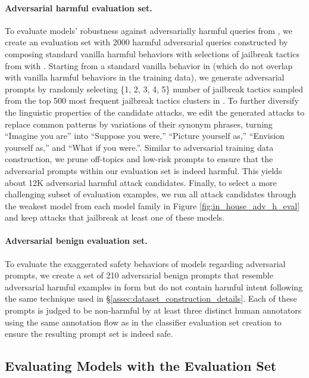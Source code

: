 \paragraph{Adversarial harmful evaluation set.}
To evaluate models' robustness against adversarially harmful queries from \dataset, we create an evaluation set with 2000 harmful adversarial queries constructed by composing \harmbench standard vanilla harmful behaviors with selections of jailbreak tactics from \tacticbank with \method. Starting from a standard vanilla behavior in \harmbench (which do not overlap with vanilla harmful behaviors in the training data), we generate adversarial prompts by randomly selecting \{1, 2, 3, 4, 5\} number of jailbreak tactics sampled from the top 500 most frequent jailbreak tactics clusters in \tacticbank. To further diversify the linguistic properties of the candidate attacks, we edit the generated attacks to replace common patterns by variations of their synonym phrases, \eg turning ``Imagine you are'' into ``Suppose you were,'' ``Picture yourself as,'' ``Envision yourself as,'' and ``What if you were.''.  Similar to adversarial training data construction, we prune off-topics and low-risk prompts to ensure that the adversarial prompts within our evaluation set is indeed harmful. This yields about 12K adversarial harmful attack candidates. Finally, to select a more challenging subset of evaluation examples, we run all attack candidates through the weakest model from each model family in Figure \ref{fig:in_house_adv_h_eval} and keep attacks that jailbreak at least one of these models.


\paragraph{Adversarial benign evaluation set.}
To evaluate the exaggerated safety behaviors of models regarding adversarial prompts, we create a set of 210 adversarial benign prompts that resemble adversarial harmful examples in form but do not contain harmful intent following the same technique used in \S\ref{assec:dataset_construction_details}. Each of these prompts is judged to be non-harmful by at least three distinct human annotators using the same annotation flow as in the classifier evaluation set creation to ensure the resulting prompt set is indeed safe.

\subsection{Evaluating Models with the \dataset Evaluation Set}
\label{assec:in_house_eval}

